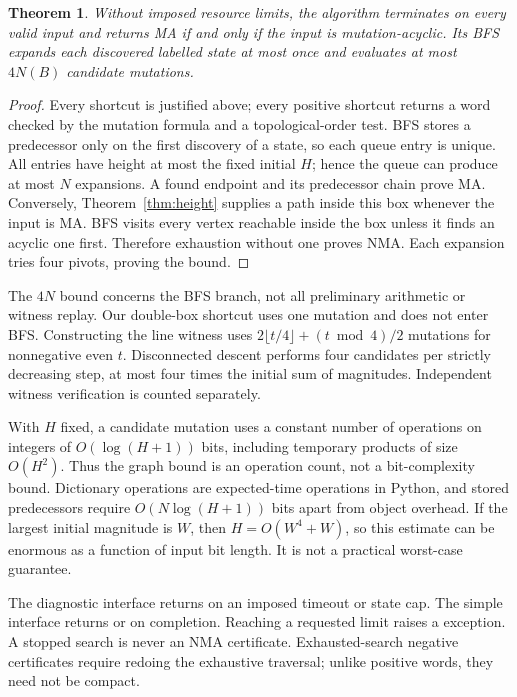 \documentclass[11pt]{amsart}
\newtheorem{theorem}{Theorem}[section]
\theoremstyle{definition}\newtheorem{definition}[theorem]{Definition}
\theoremstyle{remark}\newtheorem{remark}[theorem]{Remark}
\newcommand{\code}[1]{\texttt{\small\detokenize{#1}}}
\begin{document}
\begin{theorem}\label{thm:algorithm}
Without imposed resource limits, the algorithm terminates on every valid input and returns MA if and only if the input is mutation-acyclic. Its BFS expands each discovered labelled state at most once and evaluates at most $4N(B)$ candidate mutations.
\end{theorem}
\begin{proof}
Every shortcut is justified above; every positive shortcut returns a word checked by the mutation formula and a topological-order test. BFS stores a predecessor only on the first discovery of a state, so each queue entry is unique. All entries have height at most the fixed initial $H$; hence the queue can produce at most $N$ expansions. A found endpoint and its predecessor chain prove MA. Conversely, Theorem~\ref{thm:height} supplies a path inside this box whenever the input is MA. BFS visits every vertex reachable inside the box unless it finds an acyclic one first. Therefore exhaustion without one proves NMA. Each expansion tries four pivots, proving the bound.
\end{proof}
The $4N$ bound concerns the BFS branch, not all preliminary arithmetic or witness replay. Our double-box shortcut uses one mutation and does not enter BFS. Constructing the line witness uses $2\lfloor t/4\rfloor+(t\bmod4)/2$ mutations for nonnegative even $t$. Disconnected descent performs four candidates per strictly decreasing step, at most four times the initial sum of magnitudes. Independent witness verification is counted separately.

With $H$ fixed, a candidate mutation uses a constant number of operations on integers of $O(\log(H+1))$ bits, including temporary products of size $O(H^2)$. Thus the graph bound is an operation count, not a bit-complexity bound. Dictionary operations are expected-time operations in Python, and stored predecessors require $O(N\log(H+1))$ bits apart from object overhead. If the largest initial magnitude is $W$, then $H=O(W^4+W)$, so this estimate can be enormous as a function of input bit length. It is not a practical worst-case guarantee.

The diagnostic interface returns \code{UNKNOWN} on an imposed timeout or state cap. The simple \code{classify(adjacency)} interface returns \code{MA} or \code{NMA} on completion. Reaching a requested limit raises a \code{ResourceLimit} exception. A stopped search is never an NMA certificate. Exhausted-search negative certificates require redoing the exhaustive traversal; unlike positive words, they need not be compact.
\end{document}
